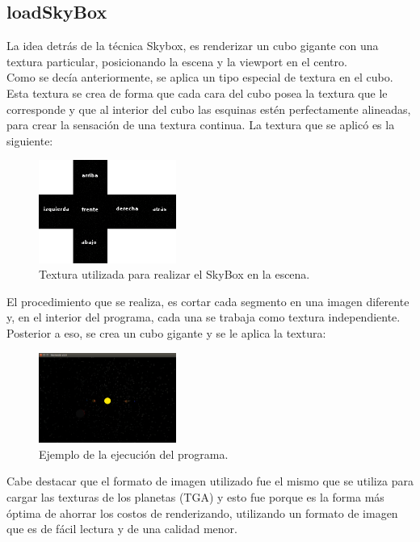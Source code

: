 \documentclass[journal]{IEEEtran}
\begin{document}
\subsection{loadSkyBox}

La idea detrás de la técnica Skybox, es renderizar un cubo gigante con una textura particular, posicionando la escena y la viewport en el centro\cite{skybox2}.\\

Como se decía anteriormente, se aplica un tipo especial de textura en el cubo. Esta textura se crea de forma que cada cara del cubo posea la textura que le corresponde y que al interior del cubo las esquinas estén perfectamente alineadas, para crear la sensación de una textura continua. La textura que se aplicó es la siguiente:

\begin{figure}[h!]
	\includegraphics[width=0.4\textwidth, height=0.25\textwidth]{skybox.png}
	\centering
	\caption{Textura utilizada para realizar el SkyBox en la escena.}
\end{figure}

El procedimiento que se realiza, es cortar cada segmento en una imagen diferente y, en el interior del programa, cada una se trabaja como textura independiente. Posterior a eso, se crea un cubo gigante y se le aplica la textura:

\begin{figure}[h!]
	\includegraphics[width=0.4\textwidth, height=0.25\textwidth]{skybox_example.png}
	\centering
	\caption{Ejemplo de la ejecución del programa.}
\end{figure}

Cabe destacar que el formato de imagen utilizado fue el mismo que se utiliza para cargar las texturas de los planetas (TGA) y esto fue porque es la forma más óptima de ahorrar los costos de renderizando, utilizando un formato de imagen que es de fácil lectura y de una calidad menor.
\end{document}
